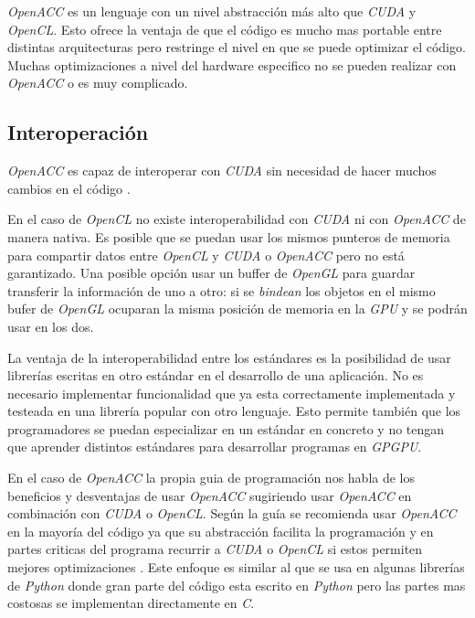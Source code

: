 \begin{pregunta}
\emph{OpenACC} es un lenguaje con un nivel abstracción más alto que \emph{CUDA}
y \emph{OpenCL}. Esto ofrece la ventaja de que el código es mucho mas portable
entre distintas arquitecturas pero restringe el nivel en que se puede optimizar
el código. Muchas optimizaciones a nivel del hardware especifico no se pueden
realizar con \emph{OpenACC} o es muy complicado.

\pagebreak
\subsection*{Interoperación}

\emph{OpenACC} es capaz de interoperar con \emph{CUDA}
sin necesidad de hacer muchos cambios en el código \cite{noauthor_3_2014}.

En el caso de \emph{OpenCL} no existe interoperabilidad con \emph{CUDA} ni con
\emph{OpenACC} de manera nativa. Es posible que se puedan usar los mismos
punteros de memoria para compartir datos entre \emph{OpenCL} y \emph{CUDA} o
\emph{OpenACC} pero no está garantizado.
Una posible opción usar un buffer de \emph{OpenGL} para guardar transferir la
información de uno a otro: si se \emph{bindean} los objetos en el mismo bufer de
\emph{OpenGL} ocuparan la misma posición de memoria en la \emph{GPU} y se podrán
usar en los dos.

La ventaja de la interoperabilidad entre los estándares es la posibilidad de usar
librerías escritas en otro estándar en el desarrollo de una aplicación. No es
necesario implementar funcionalidad que ya esta correctamente implementada y
testeada en una librería popular con otro lenguaje. Esto permite también que los
programadores se puedan especializar en un estándar en concreto y no tengan que
aprender distintos estándares para desarrollar programas en \emph{GPGPU}.

En el caso de \emph{OpenACC} la propia guia de programación nos habla de los
beneficios y desventajas de usar \emph{OpenACC} sugiriendo usar \emph{OpenACC}
en combinación con \emph{CUDA} o \emph{OpenCL}. Según la guía se recomienda usar
\emph{OpenACC} en la mayoría del código ya que su abstracción facilita la
programación y en partes criticas del programa recurrir a \emph{CUDA} o
\emph{OpenCL} si estos permiten mejores optimizaciones
\cite{noauthor_openacc_nodate}. Este enfoque es similar al que se usa en algunas
librerías de \emph{Python} donde gran parte del código esta escrito en \emph{Python}
pero las partes mas costosas se implementan directamente en \emph{C}.

\end{pregunta}
